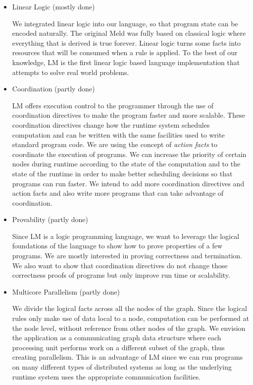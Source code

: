 \documentclass[10pt]{article}
\begin{document}
\begin{itemize}
   
   \item Linear Logic (mostly done)

   We integrated linear logic into our language, so that program state can be
   encoded naturally. The original Meld was fully based on classical logic where
   everything that is derived is true forever. Linear logic turns some facts
   into resources that will be consumed when a rule is applied.  To the best of
   our knowledge, LM is the first linear logic based language implementation
   that attempts to solve real world problems.

   \item Coordination (partly done)
   
   LM offers execution control to the programmer through the use of coordination
   directives to make the program faster and more scalable. These coordination
   directives change how the runtime system schedules computation and can be
   written with the same facilities used to write standard program code.  We are
   using the concept of \emph{action facts} to coordinate the execution of
   programs.  We can increase the priority of certain nodes during runtime
   according to the state of the computation and to the state of the runtime in
   order to make better scheduling decisions so that programs can run faster.
   We intend to add more coordination directives and action facts and also write
   more programs that can take advantage of coordination.
   
   \item Provability (partly done)
   
   Since LM is a logic programming language, we want to leverage the logical
   foundations of the language to show how to prove properties of a few
   programs. We are mostly interested in proving correctness and termination.
   We also want to show that coordination directives do not change those
   correctness proofs of programs but only improve run time or scalability.

   \item Multicore Parallelism (partly done)
   
   We divide the logical facts across all the nodes of the graph. Since the
   logical rules only make use of data local to a node, computation can be
   performed at the node level, without reference from other nodes of the graph.
   We envision the application as a communicating graph data structure where
   each processing unit performs work on a different subset of the graph, thus
   creating parallelism. This is an advantage of LM since we can run programs on
   many different types of distributed systems as long as the underlying runtime
   system uses the appropriate communication facilities.


\end{itemize}
\end{document}
